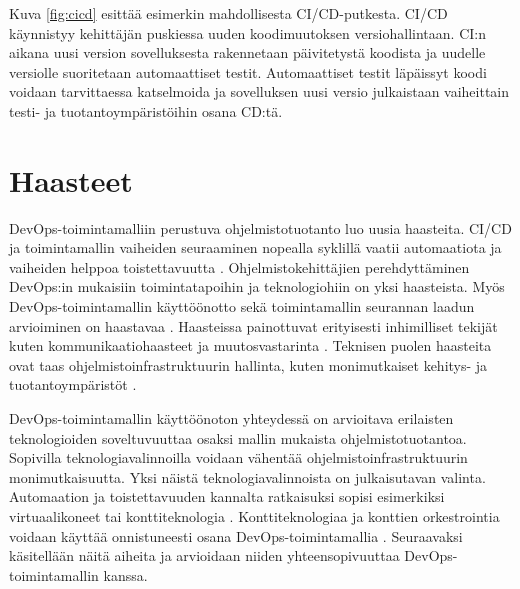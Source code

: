 Kuva \ref{fig:cicd} esittää esimerkin mahdollisesta CI/CD-putkesta. CI/CD käynnistyy kehittäjän puskiessa uuden koodimuutoksen versiohallintaan.
CI:n aikana uusi version sovelluksesta rakennetaan päivitetystä koodista ja uudelle versiolle suoritetaan automaattiset testit.
Automaattiset testit läpäissyt koodi voidaan tarvittaessa katselmoida ja sovelluksen uusi versio julkaistaan vaiheittain testi- ja tuotantoympäristöihin osana CD:tä.

\section{Haasteet}

DevOps-toimintamalliin perustuva ohjelmistotuotanto luo uusia haasteita.
CI/CD ja toimintamallin vaiheiden seuraaminen nopealla syklillä vaatii automaatiota ja vaiheiden helppoa toistettavuutta \cite{Jabbari16, Leite19}.
Ohjelmistokehittäjien perehdyttäminen DevOps:in mukaisiin toimintatapoihin ja teknologiohiin on yksi haasteista.
Myös DevOps-toimintamallin käyttöönotto sekä toimintamallin seurannan laadun arvioiminen on haastavaa \cite{Leite19}.
Haasteissa painottuvat erityisesti inhimilliset tekijät kuten kommunikaatiohaasteet ja muutosvastarinta \cite{Kalliosaari16}.
Teknisen puolen haasteita ovat taas ohjelmistoinfrastruktuurin hallinta, kuten monimutkaiset kehitys- ja tuotantoympäristöt \cite{Khan22, Kalliosaari16}.

DevOps-toimintamallin käyttöönoton yhteydessä on arvioitava erilaisten teknologioiden soveltuvuuttaa osaksi mallin mukaista ohjelmistotuotantoa.
Sopivilla teknologiavalinnoilla voidaan vähentää ohjelmistoinfrastruktuurin monimutkaisuutta.
Yksi näistä teknologiavalinnoista on julkaisutavan valinta.
Automaation ja toistettavuuden kannalta ratkaisuksi sopisi esimerkiksi virtuaalikoneet tai konttiteknologia \cite{Dua14}.
Konttiteknologiaa ja konttien orkestrointia voidaan käyttää onnistuneesti osana DevOps-toimintamallia \cite{Kang16, Narasimhulu23}.
Seuraavaksi käsitellään näitä aiheita ja arvioidaan niiden yhteensopivuuttaa DevOps-toimintamallin kanssa.
